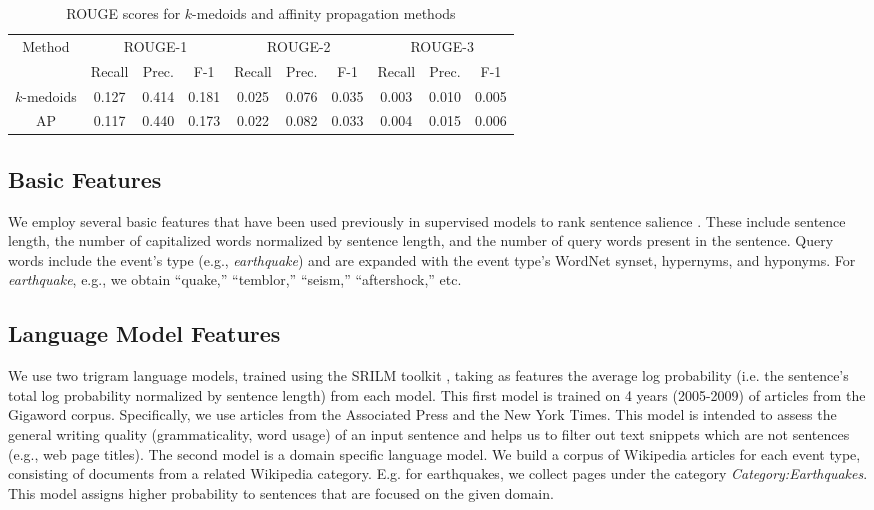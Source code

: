 \documentclass{sig-alternate} \usepackage{url} \usepackage{color}
\begin{document}
\begin{table*}[t]
\begin{center}
\begin{tabular}{| c || c | c | c || c | c | c || c | c | c |} \hline Method &
\multicolumn{3}{c}{ROUGE-1} & \multicolumn{3}{c}{ROUGE-2} &
\multicolumn{3}{c}{ROUGE-3} \\ & Recall & Prec. & F-1 & Recall & Prec. & F-1 &
Recall & Prec. & F-1 \\ \hline $k$-medoids & 0.127 & 0.414 & 0.181 & 0.025 &
0.076 & 0.035 & 0.003 & 0.010 & 0.005\\ \hline AP & 0.117 & 0.440 & 0.173 &
0.022 & 0.082 & 0.033 & 0.004 & 0.015 & 0.006\\ \hline \end{tabular}
\end{center} \caption{ROUGE scores for $k$-medoids and affinity propagation
methods} \end{table*}



\subsection{Basic Features}

We employ several basic features that have been used previously in supervised
models to rank sentence salience \cite{kupiec1995trainable,conroy2001using}.
These include sentence length, the number of capitalized words normalized by
sentence length, and the number of query words present in the sentence.  Query
words include the event's type (e.g., \emph{earthquake}) and are expanded with
the event type's WordNet \cite{miller1995wordnet} synset, hypernyms, and
hyponyms.  For \emph{earthquake}, e.g., we obtain ``quake,'' ``temblor,''
``seism,'' ``aftershock,'' etc.   


\subsection{Language Model Features}

%
We use two trigram language models, trained using the SRILM toolkit
\cite{stolcke2002srilm}, taking as features the average log probability (i.e.
the sentence's total log probability normalized by sentence length) from each
model.  This first model is trained on 4 years (2005-2009) of articles from
the Gigaword corpus.  Specifically, we use articles from the Associated Press
and the New York Times. This model is intended to assess the general writing
quality (grammaticality, word usage) of an input sentence and helps us to
filter out text snippets which are not sentences (e.g., web page titles).  The
second model is a domain specific language model. We build a corpus of
Wikipedia articles for each event type, consisting of documents from a related
Wikipedia category. E.g. for earthquakes, we collect pages under the category
\emph{Category:Earthquakes}. This model assigns higher probability to
sentences that are focused on the given domain.
\end{document}
